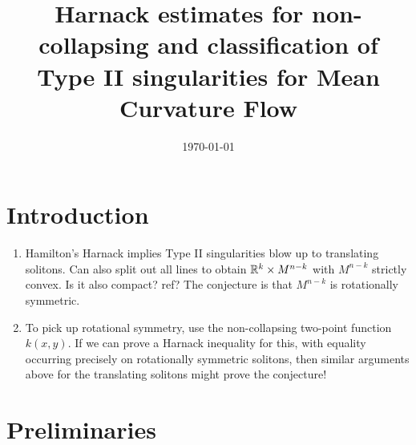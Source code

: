 \documentclass{amsart}
\begin{document}
\title[Harnack and Type II Classification]
 {Harnack estimates for non-collapsing and classification of Type II singularities for Mean Curvature Flow}

\curraddr{}
\email{}
\date{\today}

\dedicatory{}
\subjclass[2010]{}
\keywords{}

\begin{abstract}
\end{abstract}

\maketitle

\section{Introduction}

\begin{enumerate}
\item Hamilton's Harnack implies Type II singularities blow up to translating solitons. Can also split out all lines to obtain $\mathbb{R}^k \times M^{n-k}$ with $M^{n-k}$ strictly convex. Is it also compact? ref? The conjecture is that $M^{n-k}$ is rotationally symmetric. 
\item To pick up rotational symmetry, use the non-collapsing two-point function $k(x,y)$. If we can prove a Harnack inequality for this, with equality occurring precisely on rotationally symmetric solitons, then similar arguments above for the translating solitons might prove the conjecture!
\end{enumerate}

\section{Preliminaries}
\end{document}
